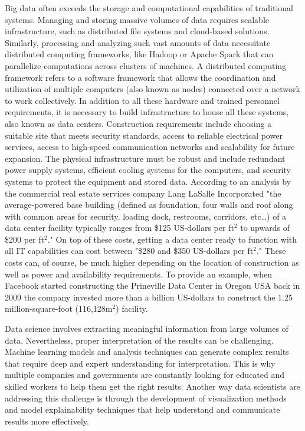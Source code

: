 \documentclass{vgtc}                          %
\begin{document}
Big data often exceeds the storage and computational capabilities of traditional systems. Managing and storing massive volumes of data requires scalable infrastructure, 
such as distributed file systems and cloud-based solutions. Similarly, processing and analyzing such vast amounts of data necessitate distributed computing 
frameworks, like Hadoop or Apache Spark that can parallelize computations across clusters of machines. A distributed computing framework refers to a software framework that 
allows the coordination and utilization of multiple computers (also known as nodes) connected over a network to work collectively. In addition to all these 
hardware and trained personnel requirements, it is necessary to build infrastructure to house all these systems, also known as data centers. Construction requirements include 
choosing a suitable site that meets security standards, access to reliable electrical power services, access to high-speed communication networks and scalability for future expansion. 
The physical infrastructure must be robust and include redundant power supply systems, efficient cooling systems for the computers, and 
security systems to protect the equipment and stored data. According to an analysis by the commercial real estate services company Lang LaSalle Incorporated "the 
average-powered base building (defined as foundation, four walls and roof along with common areas for security, loading dock, restrooms, corridors, etc…) of a 
data center facility typically ranges from \$125 US-dollars per ft$^2$ to upwards of \$200 per ft$^2$."\cite{Hawkins:2022} On top of these costs, getting a data center ready to function 
with all IT capabilities can cost between "\$280 and \$350 US-dollars per ft$^2$."\cite{Hawkins:2022} These costs can, of course, be much higher depending on the location 
of construction as well as power and availability requirements. To provide an example, when Facebook started constructing the Prineville Data Center in Oregon USA back in 2009 the 
company invested more than a billion US-dollars to construct the 1.25 million-square-foot (116,128m$^2$) facility.\newline

Data science involves extracting meaningful information from large volumes of data. Nevertheless, proper interpretation of the results can be challenging. Machine learning 
models and analysis techniques can generate complex results that require deep and expert understanding for interpretation. This is why multiple companies and governments are 
constantly looking for educated and skilled workers to help them get the right results. Another way data scientists are addressing this challenge is through the development of 
visualization methods and model explainability techniques that help understand and communicate results more effectively.
\end{document}
